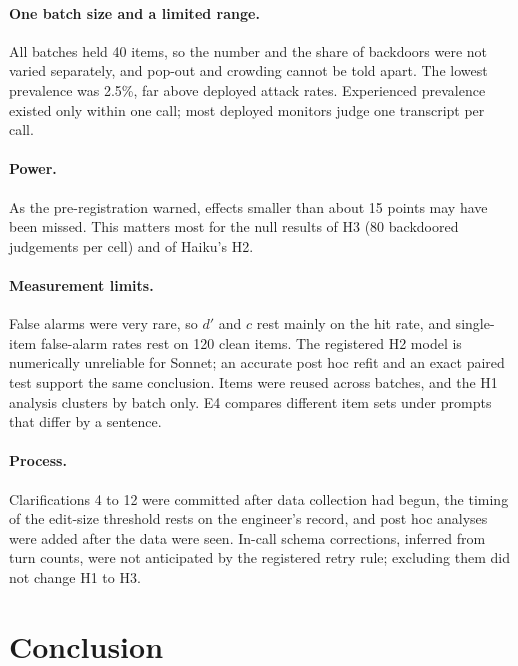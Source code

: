 \documentclass[letterpaper]{article} %
\begin{document}
\paragraph{One batch size and a limited range.} All batches held 40 items, so the number and the share of backdoors were not varied separately, and pop-out and crowding cannot be told apart. The lowest prevalence was 2.5\%, far above deployed attack rates. Experienced prevalence existed only within one call; most deployed monitors judge one transcript per call.

\paragraph{Power.} As the pre-registration warned, effects smaller than about 15 points may have been missed. This matters most for the null results of H3 (80 backdoored judgements per cell) and of Haiku's H2.

\paragraph{Measurement limits.} False alarms were very rare, so $d'$ and $c$ rest mainly on the hit rate, and single-item false-alarm rates rest on 120 clean items. The registered H2 model is numerically unreliable for Sonnet; an accurate post hoc refit and an exact paired test support the same conclusion. Items were reused across batches, and the H1 analysis clusters by batch only. E4 compares different item sets under prompts that differ by a sentence.

\paragraph{Process.} Clarifications 4 to 12 were committed after data collection had begun, the timing of the edit-size threshold rests on the engineer's record, and post hoc analyses were added after the data were seen. In-call schema corrections, inferred from turn counts, were not anticipated by the registered retry rule; excluding them did not change H1 to H3.

\section{Conclusion}
\end{document}
